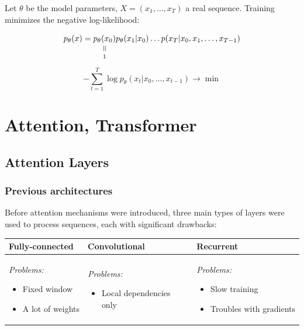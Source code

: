 \documentclass[10pt]{article}
\newcommand{\verteq}{\rotatebox{90}{$\,=$}}
\newcommand{\equalto}[2]{\underset{\scriptstyle\overset{\mkern4mu\verteq}{#2}}{#1}}
\begin{document}
Let $\theta$ be the model parameters, $X=(x_1, \ldots, x_{T})$ a real sequence.
Training minimizes the negative log-likelihood:

\begin{equation*} 
p_{\theta} (x) = \equalto{p_{\theta} (x_0)}{1} p_{\theta} (x_1 | x_0) \ldots 
p(x_{T} | x_{0}, x_{1}, \ldots, x_{T-1})
\end{equation*}

\begin{equation*} 
-\sum_{t=1}^{T} \log p_{\theta} (x_{t} | x_{0}, \ldots, x_{t-1}) \rightarrow \min
\end{equation*}

\section{Attention, Transformer}

\subsection{Attention Layers}


\subsubsection{Previous architectures}

Before attention mechanisms were introduced, three main types of layers 
were used to process sequences, each with significant drawbacks:
\begin{center}
\renewcommand{\arraystretch}{1.1}
\begin{tabular}{|p{4cm}|p{4cm}|p{4cm}|}
\hline
\rule{0pt}{10pt}\textbf{Fully-connected} & \textbf{Convolutional} & \textbf{Recurrent} \\
\hline
\rule{0pt}{8pt}
\textit{Problems:}
\begin{itemize}[leftmargin=*, topsep=2pt]
    \item Fixed window
    \item A lot of weights
\end{itemize} &
\textit{Problems:}
\begin{itemize}[leftmargin=*, topsep=2pt]
    \item Local dependencies only
\end{itemize} &
\textit{Problems:}
\begin{itemize}[leftmargin=*, topsep=2pt]
    \item Slow training
    \item Troubles with gradients
\end{itemize} \\
\hline
\end{tabular}
\end{center}
\end{document}
